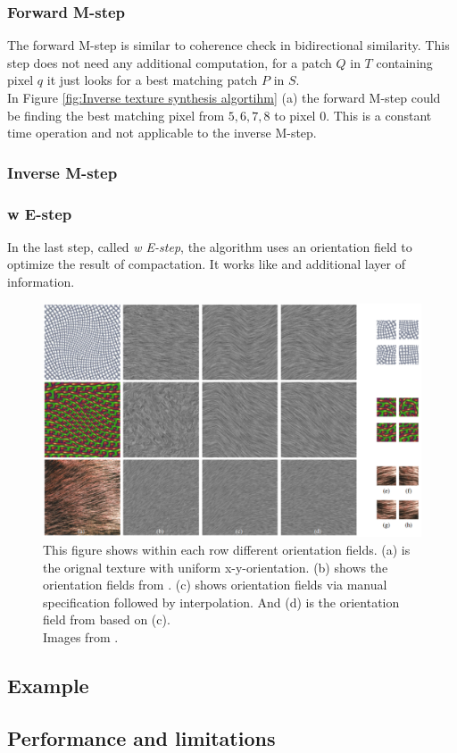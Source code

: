 \subsubsection{Forward M-step}
The forward M-step is similar to coherence check in bidirectional similarity. This step does not need any additional computation, for a patch $Q$ in $T$ containing pixel $q$ it just looks for a best matching patch $P$ in $S$.\\
In Figure \ref{fig:Inverse texture synthesis algortihm} (a) the forward M-step could be finding the best matching pixel from ${5,6,7,8}$ to pixel $0$. This is a constant time operation and not applicable to the inverse M-step. 

\subsubsection{Inverse M-step}
\subsubsection{w E-step}
In the last step, called \textit{w E-step}, the algorithm uses an orientation field to optimize the result of compactation. It works like and additional layer of information.

\begin{figure}[h]
\centering
\includegraphics[scale=0.4]{img/orientationfield}
\caption[Orientation field]{This figure shows within each row different orientation fields. (a) is the orignal texture with uniform x-y-orientation. (b) shows the orientation fields from \cite{paris}. (c) shows orientation fields via manual specification followed by interpolation. And (d) is the orientation field from \cite{its} based on (c).\\ Images from \cite{its}.}
\label{fig:Orientation field}
\end{figure}


\subsection{Example}
\subsection{Performance and limitations}